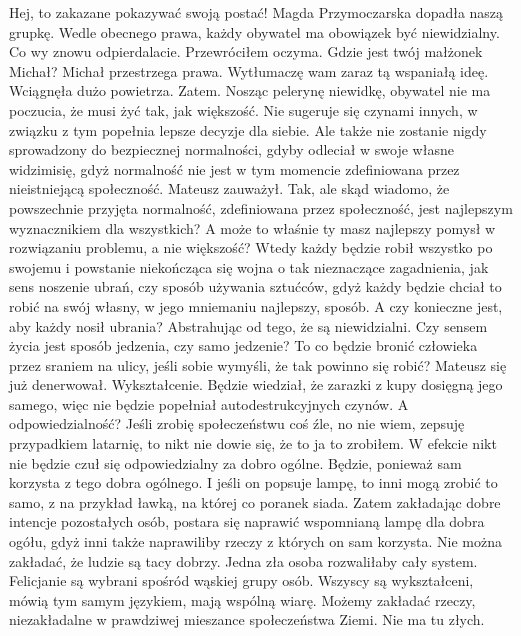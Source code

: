 \begin{dialogue}
\ds{} Hej, to zakazane pokazywać swoją postać! \dm{} Magda Przymoczarska dopadła naszą grupkę. \dm{} Wedle obecnego prawa, każdy obywatel ma obowiązek być niewidzialny.
\ds{} Co wy znowu odpierdalacie. \dm{} Przewróciłem oczyma. \dm{} Gdzie jest twój małżonek Michał?
\ds{} Michał przestrzega prawa. Wytłumaczę wam zaraz tą wspaniałą ideę. \dm{} Wciągnęła dużo powietrza. \dm{} Zatem. Nosząc pelerynę niewidkę, obywatel nie ma poczucia, że musi żyć tak, jak większość. 
Nie sugeruje się czynami innych, w związku z tym popełnia lepsze decyzje dla siebie.
\ds{} Ale także nie zostanie nigdy sprowadzony do bezpiecznej normalności, gdyby odleciał w swoje własne widzimisię, gdyż normalność nie jest w tym momencie zdefiniowana przez nieistniejącą społeczność. \dm{} Mateusz zauważył.
\ds{} Tak, ale skąd wiadomo, że powszechnie przyjęta normalność, zdefiniowana przez społeczność, jest najlepszym wyznacznikiem dla wszystkich? 
A może to właśnie ty masz najlepszy pomysł w rozwiązaniu problemu, a nie większość?
\ds{} Wtedy każdy będzie robił wszystko po swojemu i powstanie niekończąca się wojna o tak nieznaczące zagadnienia, jak sens noszenie ubrań, czy sposób używania sztućców, gdyż każdy będzie chciał to robić na swój własny, w jego mniemaniu najlepszy, sposób.
\ds{} A czy konieczne jest, aby każdy nosił ubrania? Abstrahując od tego, że są niewidzialni. Czy sensem życia jest sposób jedzenia, czy samo jedzenie?
\ds{} To co będzie bronić człowieka przez sraniem na ulicy, jeśli sobie wymyśli, że tak powinno się robić? \dm{} Mateusz się już denerwował.
\ds{} Wykształcenie. Będzie wiedział, że zarazki z kupy dosięgną jego samego, więc nie będzie popełniał autodestrukcyjnych czynów.
\ds{} A odpowiedzialność? Jeśli zrobię społeczeństwu coś źle, no nie wiem, zepsuję przypadkiem latarnię, to nikt nie dowie się, że to ja to zrobiłem.
W efekcie nikt nie będzie czuł się odpowiedzialny za dobro ogólne.
\ds{} Będzie, ponieważ sam korzysta z tego dobra ogólnego. I jeśli on popsuje lampę, to inni mogą zrobić to samo, z na przykład ławką, na której co poranek siada.
Zatem zakładając dobre intencje pozostałych osób, postara się naprawić wspomnianą lampę dla dobra ogółu, gdyż inni także naprawiliby rzeczy z których on sam korzysta.
\ds{} Nie można zakładać, że ludzie są tacy dobrzy. Jedna zła osoba rozwaliłaby cały system.
\ds{} Felicjanie są wybrani spośród wąskiej grupy osób. Wszyscy są wykształceni, mówią tym samym językiem, mają wspólną wiarę. 
Możemy zakładać rzeczy, niezakładalne w prawdziwej mieszance społeczeństwa Ziemi. Nie ma tu złych.
\end{dialogue}
